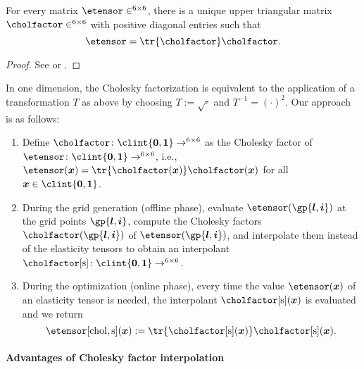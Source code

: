 
\begin{proposition}
  For every \spd matrix $\etensor \in \real^{6 \times 6}$,
  there is a unique upper triangular matrix
  $\cholfactor \in \real^{6 \times 6}$
  with positive diagonal entries such that
  \begin{equation}
    \etensor
    = \tr{\cholfactor} \cholfactor.
  \end{equation}
\end{proposition}

\begin{proof}
  See \cite{Benoit24Note} or \cite{Freund07Stoer}.
\end{proof}

In one dimension, the Cholesky factorization is equivalent
to the application of a transformation $T$ as above by choosing
$T := \sqrt{\cdot}$ and $T^{-1} = (\cdot)^2$.
Our approach is as follows:
\begin{enumerate}
  \item
  Define $\cholfactor\colon \clint{\*0, \*1} \to \real^{6 \times 6}$
  as the Cholesky factor of
  $\etensor\colon \clint{\*0, \*1} \to \real^{6 \times 6}$, i.e.,
  $\etensor(\*x) = \tr{\cholfactor(\*x)} \cholfactor(\*x)$
  for all $\*x \in \clint{\*0, \*1}$.
  
  \item
  During the grid generation (offline phase),
  evaluate $\etensor(\gp{\*l,\*i})$ at the grid points $\gp{\*l,\*i}$,
  compute the Cholesky factors $\cholfactor(\gp{\*l,\*i})$ of
  $\etensor(\gp{\*l,\*i})$,
  and interpolate them instead of the elasticity tensors
  to obtain an interpolant
  $\cholfactor[\sparse]\colon \clint{\*0, \*1} \to \real^{6 \times 6}$.
  
  \item
  During the optimization (online phase),
  every time the value $\etensor(\*x)$ of an elasticity tensor is needed,
  the interpolant $\cholfactor[\sparse](\*x)$ is evaluated and we return
  \begin{equation}
    \etensor[\chol,\sparse](\*x)
    := \tr{\cholfactor[\sparse](\*x)} \cholfactor[\sparse](\*x).
  \end{equation}
\end{enumerate}

\paragraph{Advantages of Cholesky factor interpolation}

